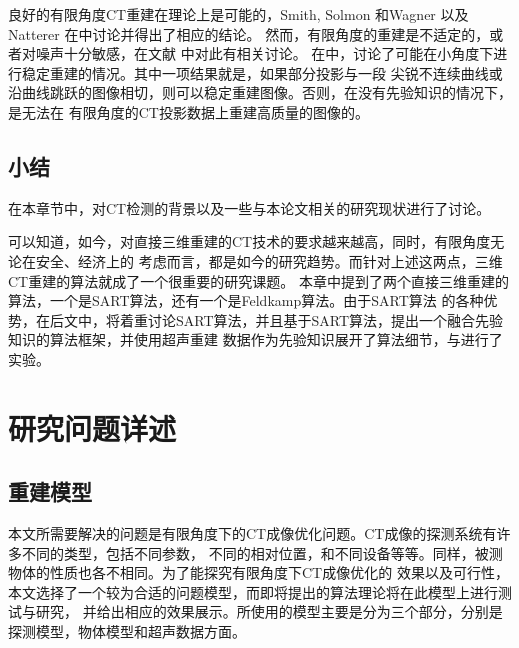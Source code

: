 良好的有限角度CT重建在理论上是可能的，Smith, Solmon 和Wagner\cite{smith1977practical}
以及Natterer 在\cite{natterer2002mathematics}中讨论并得出了相应的结论。
然而，有限角度的重建是不适定的，或者对噪声十分敏感，在文献
\cite{davison1983ill}\cite{maass1987x}中对此有相关讨论。
在\cite{quinto1993singularities}中，讨论了可能在小角度下进行稳定重建的情况。其中一项结果就是，如果部分投影与一段
尖锐不连续曲线或沿曲线跳跃的图像相切，则可以稳定重建图像。否则，在没有先验知识的情况下，是无法在
有限角度的CT投影数据上重建高质量的图像的。
\section{小结}
在本章节中，对CT检测的背景以及一些与本论文相关的研究现状进行了讨论。

可以知道，如今，对直接三维重建的CT技术的要求越来越高，同时，有限角度无论在安全、经济上的
考虑而言，都是如今的研究趋势。而针对上述这两点，三维CT重建的算法就成了一个很重要的研究课题。
本章中提到了两个直接三维重建的算法，一个是SART算法，还有一个是Feldkamp算法。由于SART算法
的各种优势，在后文中，将着重讨论SART算法，并且基于SART算法，提出一个融合先验知识的算法框架，并使用超声重建
数据作为先验知识展开了算法细节，与进行了实验。


\chapter{研究问题详述}
\section{重建模型}
本文所需要解决的问题是有限角度下的CT成像优化问题。CT成像的探测系统有许多不同的类型，包括不同参数，
不同的相对位置，和不同设备等等。同样，被测物体的性质也各不相同。为了能探究有限角度下CT成像优化的
效果以及可行性，本文选择了一个较为合适的问题模型，而即将提出的算法理论将在此模型上进行测试与研究，
并给出相应的效果展示。所使用的模型主要是分为三个部分，分别是探测模型，物体模型和超声数据方面。
